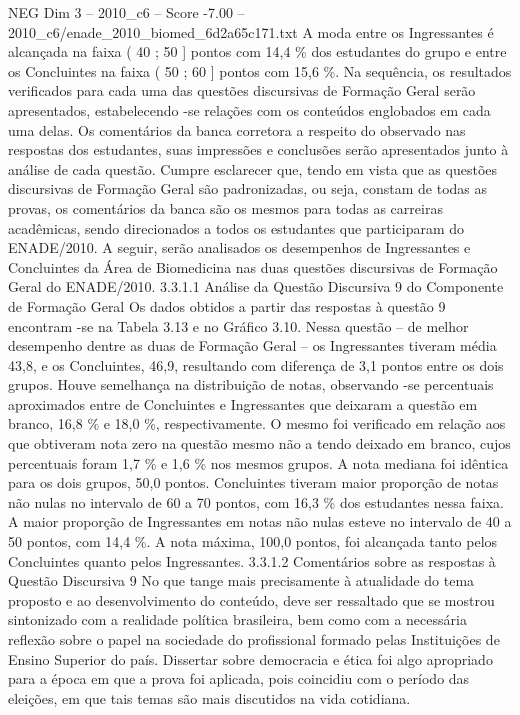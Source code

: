 \begin{textsample}{NEG Dim 3 – 2010\_c6 – Score -7.00 – 2010\_c6/enade\_2010\_biomed\_6d2a65c171.txt}
A moda entre os Ingressantes é alcançada na faixa ( 40 ; 50 ] pontos com 14,4 \% dos estudantes do grupo e entre os Concluintes na faixa ( 50 ; 60 ] pontos com 15,6 \%.
Na sequência, os resultados verificados para cada uma das questões discursivas de Formação Geral serão apresentados, estabelecendo -se relações com os conteúdos englobados em cada uma delas.
Os comentários da banca corretora a respeito do observado nas respostas dos estudantes, suas impressões e conclusões serão apresentados junto à análise de cada questão.
Cumpre esclarecer que, tendo em vista que as questões discursivas de Formação Geral são padronizadas, ou seja, constam de todas as provas, os comentários da banca são os mesmos para todas as carreiras acadêmicas, sendo direcionados a todos os estudantes que participaram do ENADE/2010.
A seguir, serão analisados os desempenhos de Ingressantes e Concluintes da Área de Biomedicina nas duas questões discursivas de Formação Geral do ENADE/2010. 3.3.1.1 Análise da Questão Discursiva 9 do Componente de Formação Geral Os dados obtidos a partir das respostas à questão 9 encontram -se na Tabela 3.13 e no Gráfico 3.10.
Nessa questão – de melhor desempenho dentre as duas de Formação Geral – os Ingressantes tiveram média 43,8, e os Concluintes, 46,9, resultando com diferença de 3,1 pontos entre os dois grupos.
Houve semelhança na distribuição de notas, observando -se percentuais aproximados entre de Concluintes e Ingressantes que deixaram a questão em branco, 16,8 \% e 18,0 \%, respectivamente.
O mesmo foi verificado em relação aos que obtiveram nota zero na questão mesmo não a tendo deixado em branco, cujos percentuais foram 1,7 \% e 1,6 \% nos mesmos grupos.
A nota mediana foi idêntica para os dois grupos, 50,0 pontos.
Concluintes tiveram maior proporção de notas não nulas no intervalo de 60 a 70 pontos, com 16,3 \% dos estudantes nessa faixa.
A maior proporção de Ingressantes em notas não nulas esteve no intervalo de 40 a 50 pontos, com 14,4 \%.
A nota máxima, 100,0 pontos, foi alcançada tanto pelos Concluintes quanto pelos Ingressantes. 3.3.1.2 Comentários sobre as respostas à Questão Discursiva 9 No que tange mais precisamente à atualidade do tema proposto e ao desenvolvimento do conteúdo, deve ser ressaltado que se mostrou sintonizado com a realidade política brasileira, bem como com a necessária reflexão sobre o papel na sociedade do profissional formado pelas Instituições de Ensino Superior do país.
Dissertar sobre democracia e ética foi algo apropriado para a época em que a prova foi aplicada, pois coincidiu com o período das eleições, em que tais temas são mais discutidos na vida cotidiana.

\end{textsample}
